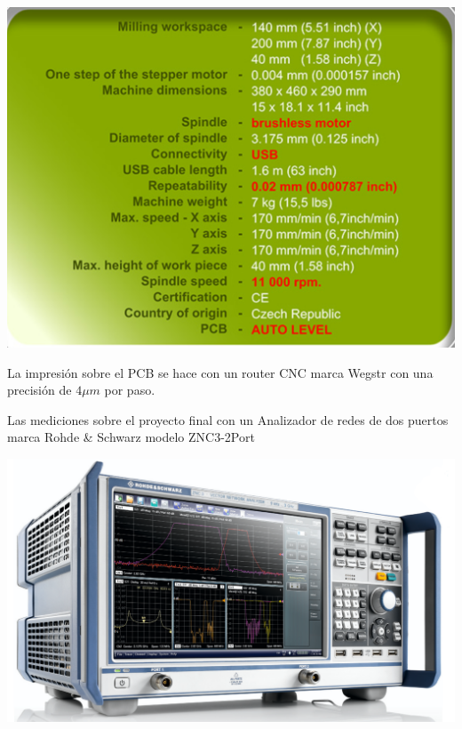 \documentclass[a4paper, 12pt]{article}
\begin{document}
\begin{minipage}{0.32\linewidth}
    \includegraphics[width=0.8\linewidth]{./img/datasheet_wegstr.png}
\end{minipage}
\begin{minipage}[t]{0.66\linewidth}
La impresión sobre el PCB se hace con un router CNC marca Wegstr con una precisión de $4\mu m$ por paso.
\end{minipage}
\begin{minipage}{0.4\linewidth}
  Las mediciones sobre el proyecto final con un Analizador de redes de dos puertos marca Rohde & Schwarz modelo ZNC3-2Port
\end{minipage}
\begin{minipage}{0.59\linewidth}
  \includegraphics[width=\linewidth]{./img/vna.png}
\end{minipage}
\end{document}
